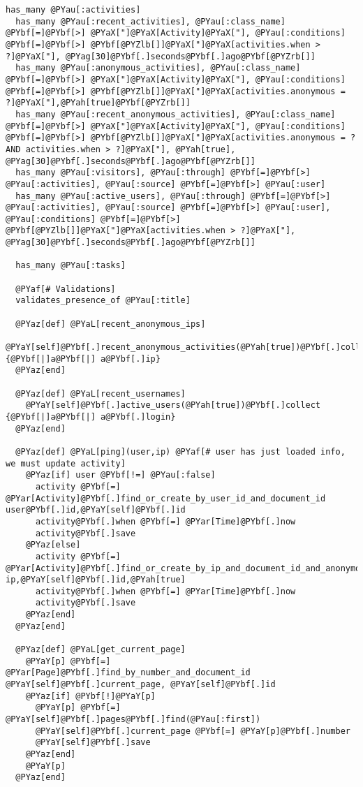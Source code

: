 \begin{Verbatim}[commandchars=@\[\]]
  has_many @PYau[:activities]
  has_many @PYau[:recent_activities], @PYau[:class_name] @PYbf[=]@PYbf[>] @PYaX["]@PYaX[Activity]@PYaX["], @PYau[:conditions] @PYbf[=]@PYbf[>] @PYbf[@PYZlb[]]@PYaX["]@PYaX[activities.when > ?]@PYaX["], @PYag[30]@PYbf[.]seconds@PYbf[.]ago@PYbf[@PYZrb[]]
  has_many @PYau[:anonymous_activities], @PYau[:class_name] @PYbf[=]@PYbf[>] @PYaX["]@PYaX[Activity]@PYaX["], @PYau[:conditions] @PYbf[=]@PYbf[>] @PYbf[@PYZlb[]]@PYaX["]@PYaX[activities.anonymous = ?]@PYaX["],@PYah[true]@PYbf[@PYZrb[]]
  has_many @PYau[:recent_anonymous_activities], @PYau[:class_name] @PYbf[=]@PYbf[>] @PYaX["]@PYaX[Activity]@PYaX["], @PYau[:conditions] @PYbf[=]@PYbf[>] @PYbf[@PYZlb[]]@PYaX["]@PYaX[activities.anonymous = ? AND activities.when > ?]@PYaX["], @PYah[true], @PYag[30]@PYbf[.]seconds@PYbf[.]ago@PYbf[@PYZrb[]]
  has_many @PYau[:visitors], @PYau[:through] @PYbf[=]@PYbf[>] @PYau[:activities], @PYau[:source] @PYbf[=]@PYbf[>] @PYau[:user]
  has_many @PYau[:active_users], @PYau[:through] @PYbf[=]@PYbf[>] @PYau[:activities], @PYau[:source] @PYbf[=]@PYbf[>] @PYau[:user], @PYau[:conditions] @PYbf[=]@PYbf[>] @PYbf[@PYZlb[]]@PYaX["]@PYaX[activities.when > ?]@PYaX["], @PYag[30]@PYbf[.]seconds@PYbf[.]ago@PYbf[@PYZrb[]]
  
  has_many @PYau[:tasks]
  
  @PYaf[# Validations]
  validates_presence_of @PYau[:title]
  
  @PYaz[def] @PYaL[recent_anonymous_ips]
    @PYaY[self]@PYbf[.]recent_anonymous_activities(@PYah[true])@PYbf[.]collect {@PYbf[|]a@PYbf[|] a@PYbf[.]ip}
  @PYaz[end]
  
  @PYaz[def] @PYaL[recent_usernames]
    @PYaY[self]@PYbf[.]active_users(@PYah[true])@PYbf[.]collect {@PYbf[|]a@PYbf[|] a@PYbf[.]login}
  @PYaz[end]
  
  @PYaz[def] @PYaL[ping](user,ip) @PYaf[# user has just loaded info, we must update activity]
    @PYaz[if] user @PYbf[!=] @PYau[:false]
      activity @PYbf[=] @PYar[Activity]@PYbf[.]find_or_create_by_user_id_and_document_id user@PYbf[.]id,@PYaY[self]@PYbf[.]id
      activity@PYbf[.]when @PYbf[=] @PYar[Time]@PYbf[.]now
      activity@PYbf[.]save
    @PYaz[else]
      activity @PYbf[=] @PYar[Activity]@PYbf[.]find_or_create_by_ip_and_document_id_and_anonymous ip,@PYaY[self]@PYbf[.]id,@PYah[true]
      activity@PYbf[.]when @PYbf[=] @PYar[Time]@PYbf[.]now
      activity@PYbf[.]save
    @PYaz[end]
  @PYaz[end]
  
  @PYaz[def] @PYaL[get_current_page]
    @PYaY[p] @PYbf[=] @PYar[Page]@PYbf[.]find_by_number_and_document_id @PYaY[self]@PYbf[.]current_page, @PYaY[self]@PYbf[.]id
    @PYaz[if] @PYbf[!]@PYaY[p]
      @PYaY[p] @PYbf[=] @PYaY[self]@PYbf[.]pages@PYbf[.]find(@PYau[:first])
      @PYaY[self]@PYbf[.]current_page @PYbf[=] @PYaY[p]@PYbf[.]number
      @PYaY[self]@PYbf[.]save
    @PYaz[end]
    @PYaY[p]
  @PYaz[end]
  

\end{Verbatim}
